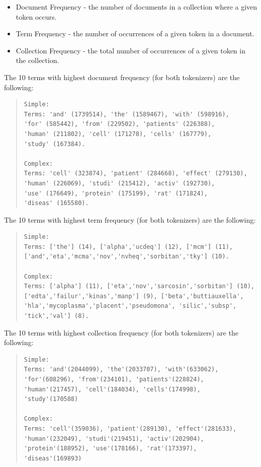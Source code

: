 \documentclass[12pt]{article}
\begin{document}
\begin{itemize}[leftmargin=*]
\setlength\itemsep{-0.3em}
\item Document Frequency - the number of documents in a collection where 
a given token occurs.
\item Term Frequency - the number of occurrences of a given token in a 
document.
\item Collection Frequency - the total number of occurrences of a given 
token in the collection.
\end{itemize}

The 10 terms with highest document frequency (for both tokenizers) are the 
following:

\begingroup
\addtolength\leftmargini{-0.4in}
\addtolength\baselineskip{-0.05in}
\begin{quote}
\begin{verbatim}
Simple:
Terms: 'and' (1739514), 'the' (1589467), 'with' (598916), 
'for' (585442), 'from' (229502), 'patients' (226388), 
'human' (211802), 'cell' (171278), 'cells' (167779), 
'study' (167384).

Complex:
Terms: 'cell' (323874), 'patient' (284668), 'effect' (279130),
'human' (226069), 'studi' (215412), 'activ' (192730),
'use' (176649), 'protein' (175199), 'rat' (171824),
'diseas' (165580).
\end{verbatim}
\end{quote}
\endgroup

The 10 terms with highest term frequency (for both tokenizers) are the 
following:

\begingroup
\addtolength\leftmargini{-0.4in}
\addtolength\baselineskip{-0.05in}
\begin{quote}
\begin{verbatim}
Simple:
Terms: ['the'] (14), ['alpha','ucdeq'] (12), ['mcm'] (11),
['and','eta','mcma','nov','nvheq','sorbitan','tky'] (10).

Complex:
Terms: ['alpha'] (11), ['eta','nov','sarcosin','sorbitan'] (10),
['edta','failur','kinas','manp'] (9), ['beta','buttiauxella',
'hla','mycoplasma','placent','pseudomona', 'silic','subsp',
'tick','val'] (8).
\end{verbatim}
\end{quote}
\endgroup

\newpage
The 10 terms with highest collection frequency (for both tokenizers) are the 
following:

\begingroup
\addtolength\leftmargini{-0.4in}
\addtolength\baselineskip{-0.05in}
\begin{quote}
\begin{verbatim}
Simple:
Terms: 'and'(2044099), 'the'(2033707), 'with'(633062), 
'for'(608296), 'from'(234101), 'patients'(228824),
'human'(217457), 'cell'(184034), 'cells'(174998),
'study'(170588)

Complex:
Terms: 'cell'(359036), 'patient'(289130), 'effect'(281633),
'human'(232049), 'studi'(219451), 'activ'(202904),
'protein'(188952), 'use'(178166), 'rat'(173397),
'diseas'(169893)
\end{verbatim}
\end{quote}
\endgroup
\end{document}

